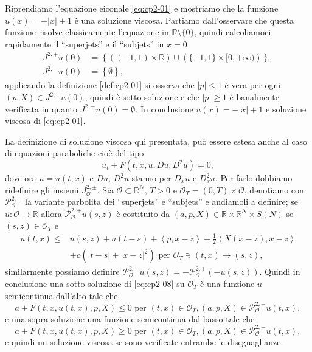 \begin{esempio}
Riprendiamo l'equazione eiconale \eqref{eq:cp2-01} e mostriamo che la funzione $u(x) = -|x| + 1$ è una soluzione viscosa. Partiamo dall'osservare che questa funzione risolve classicamente l'equazione in $\mathbb{R}\setminus\{0\}$, quindi
calcoliamoci rapidamente il ``superjets'' e il ``subjets'' in $\hat{x}=0$
\[
\begin{aligned}
  J^{2,+}u(0) &= \left\{\left((-1,1)\times\mathbb{R}\right)\cup\left(\{-1,1\}\times [0,+\infty)\right)\right\}, \\
  J^{2,-}u(0) &= \left\{\emptyset\right\},
\end{aligned}
\]
applicando la definizione \ref{def:cp2-01} si osserva che $|p|\leq 1$ è vera per ogni $(p,X)\in J^{2,+}u(0)$, quindi è sotto soluzione e che $|p|\geq 1$ è banalmente verificata in quanto $J^{2,-}u(0)=\emptyset$. In conclusione $u(x)=-|x|+1$ e soluzione viscosa di \eqref{eq:cp2-01}.  
\end{esempio}

La definizione di soluzione viscosa qui presentata, può essere estesa anche al caso di equazioni paraboliche cioè del tipo
\begin{equation}
\label{eq:cp2-08}
u_t + F(t,x,u,Du,D^2u) = 0,
\end{equation}
dove ora $u=u(t,x)$ e $Du$, $D^2u$ stanno per $D_xu$ e $D^2_xu$. Per farlo dobbiamo ridefinire gli insiemi $J_{\mathcal{O}}^{2,\pm}$. Sia $\mathcal{O}\subset\mathbb{R}^N$, $T>0$ e $\mathcal{O}_T = (0,T)\times\mathcal{O}$, denotiamo con $\mathcal{P}_{\mathcal{O}}^{2,\pm}$ la variante parbolita dei ``superjets'' e ``subjets'' e andiamoli a definire; se $u:\mathcal{O}\to\mathbb{R}$ allora $\mathcal{P}_{\mathcal{O}}^{2,+}u(s,z)$ è costituito da $(a,p,X)\in\mathbb{R}\times\mathbb{R}^N\times S(N)$ se $(s,z)\in\mathcal{O}_T$ e
\[
\begin{aligned}
  u(t,x)\leq &u(s,z) +a(t-s)+\left<p,x-z\right>+\frac{1}{2}\left<X(x-z),x-z\right> \\
  &+o(|t-s|+|x-z|^2)\text{ per }\mathcal{O}_T\ni (t,x)\to(s,z),
\end{aligned}
\]
similarmente possiamo definire $\mathcal{P}_{\mathcal{O}}^{2,-}u(s,z)=-\mathcal{P}_{\mathcal{O}}^{2,+}(-u(s,z))$. Quindi in conclusione una sotto soluzione di \eqref{eq:cp2-08} su $\mathcal{O}_T$ è una funzione $u$ semicontinua dall'alto tale che
\[
a+F(t,x,u(t,x),p,X)\leq 0\text{ per }(t,x)\in\mathcal{O}_T,(a,p,X)\in\mathcal{P}_{\mathcal{O}}^{2,+}u(t,x),
\]
e una sopra soluzione una funzione semicontinua dal basso tale che
\[
a+F(t,x,u(t,x),p,X)\geq 0\text{ per }(t,x)\in\mathcal{O}_T,(a,p,X)\in\mathcal{P}_{\mathcal{O}}^{2,-}u(t,x),
\]
e quindi un soluzione viscosa se sono verificate entrambe le diseguaglianze.

